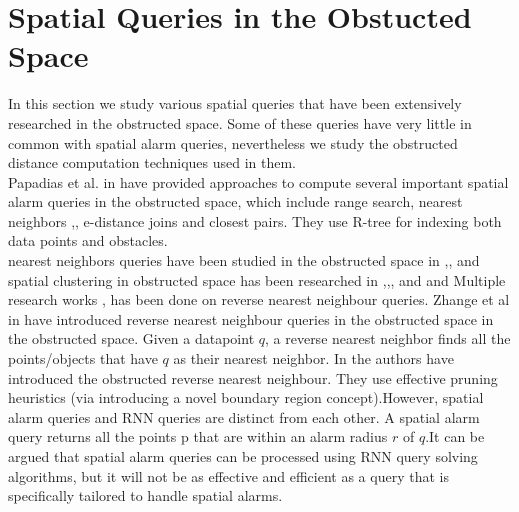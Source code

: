 \vspace{10pt}


\section{\label{sec:obstructed}Spatial Queries in the Obstucted Space}
In this section we study various spatial queries that have been extensively researched in the obstructed space. Some of these queries have very little in common with spatial alarm queries, nevertheless we study the obstructed distance computation techniques used in them.\\

Papadias et al. in \cite{obst1} have provided approaches to compute several important spatial alarm queries in the obstructed space, which include range search, nearest neighbors \cite{obst6},\cite{obst4}, e-distance joins and closest pairs. They use R-tree for indexing both data points and obstacles.  \\
nearest neighbors queries have been studied in the obstructed space in \cite{obst6},\cite{obst4},\cite{obst12} and spatial clustering in obstructed space has been researched in \cite{obst8},\cite{obst9},\cite{obst10}, and and \cite{obst11} 
Multiple research works \cite{obst3}, \cite{obst2} has been done on reverse nearest neighbour queries. Zhange et al in \cite{obst2} have introduced reverse nearest neighbour queries in the obstructed space in the obstructed space. Given a datapoint $q$, a reverse nearest neighbor finds all the points/objects that have $q$ as their nearest neighbor. In \cite{obst2} the authors have introduced the obstructed reverse nearest neighbour. They use effective pruning heuristics (via introducing a novel boundary region concept).However, spatial alarm queries and RNN queries are distinct from each other. A spatial alarm query returns all the points p that are within an alarm radius $r$ of $q$.It can be argued that spatial alarm queries can be processed using RNN query solving algorithms, but it will not be as effective and efficient as a query that is specifically tailored to handle spatial alarms.\\ 
